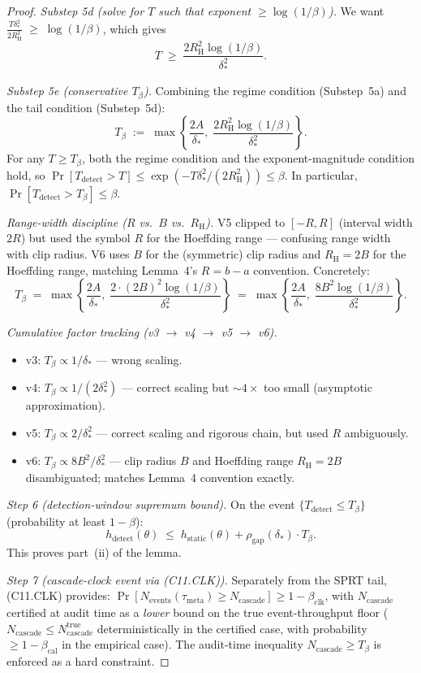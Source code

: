 \documentclass{article}
\newcommand{\deltastar}{\delta_{*}}
\newcommand{\rhogap}{\rho_{\mathrm{gap}}}
\newcommand{\Tbeta}{T_{\beta}}
\newcommand{\Ncasc}{N_{\mathrm{cascade}}}
\newcommand{\Nev}{N_{\mathrm{events}}}
\newcommand{\bclk}{\beta_{\mathrm{clk}}}
\newcommand{\bcal}{\beta_{\mathrm{cal}}}
\newcommand{\Bclip}{B}
\newcommand{\Rh}{R_{\mathrm{H}}}
\begin{document}
\begin{proof}
\emph{Substep 5d (solve for $T$ such that exponent $\geq \log(1/\beta)$).}
We want
$\frac{T \deltastar^2}{2 \Rh^2} \;\geq\; \log(1/\beta)$,
which gives
\[
  T \;\geq\; \frac{2 \Rh^2 \log(1/\beta)}{\deltastar^2}.
\]

\emph{Substep 5e (conservative $\Tbeta$).}  Combining the regime
condition (Substep~5a) and the tail condition (Substep~5d):
\[
  \Tbeta \;:=\; \max\!\left\{\frac{2A}{\deltastar},\;
  \frac{2\Rh^2 \log(1/\beta)}{\deltastar^2}\right\}.
\]
For any $T \geq \Tbeta$, both the regime condition and the
exponent-magnitude condition hold, so $\Pr[T_{\mathrm{detect}} > T]
\leq \exp(-T\deltastar^2/(2\Rh^2)) \leq \beta$.  In particular,
$\Pr[T_{\mathrm{detect}} > \Tbeta] \leq \beta$.

\emph{Range-width discipline ($R$ vs.\ $\Bclip$ vs.\ $\Rh$).}  V5
clipped to $[-R, R]$ (interval width $2R$) but used the symbol $R$
for the Hoeffding range — confusing range width with clip radius.
V6 uses $\Bclip$ for the (symmetric) clip radius and
$\Rh = 2\Bclip$ for the Hoeffding range, matching Lemma~4's
$R = b - a$ convention.  Concretely:
\[
  \Tbeta \;=\; \max\!\left\{\frac{2A}{\deltastar},\;
  \frac{2 \cdot (2\Bclip)^2 \log(1/\beta)}{\deltastar^2}\right\}
  \;=\; \max\!\left\{\frac{2A}{\deltastar},\;
  \frac{8 \Bclip^2 \log(1/\beta)}{\deltastar^2}\right\}.
\]

\emph{Cumulative factor tracking (v3 $\to$ v4 $\to$ v5 $\to$ v6).}
\begin{itemize}
\item v3: $\Tbeta \propto 1/\deltastar$ — wrong scaling.
\item v4: $\Tbeta \propto 1/(2\deltastar^2)$ — correct scaling but
  $\sim$$4\times$ too small (asymptotic approximation).
\item v5: $\Tbeta \propto 2/\deltastar^2$ — correct scaling and
  rigorous chain, but used $R$ ambiguously.
\item v6: $\Tbeta \propto 8\Bclip^2/\deltastar^2$ — clip radius
  $\Bclip$ and Hoeffding range $\Rh = 2\Bclip$ disambiguated;
  matches Lemma~4 convention exactly.
\end{itemize}

\emph{Step 6 (detection-window supremum bound).}  On the event
$\{T_{\mathrm{detect}} \leq \Tbeta\}$ (probability at least
$1-\beta$):
\[
  h_{\mathrm{detect}}(\theta) \;\leq\;
  h_{\mathrm{static}}(\theta) + \rhogap(\deltastar) \cdot
  \Tbeta.
\]
This proves part~(ii) of the lemma.

\emph{Step 7 (cascade-clock event via (C11.CLK)).}  Separately
from the SPRT tail, (C11.CLK) provides:
$\Pr[\Nev(\tau_{\mathrm{meta}}) \geq \Ncasc] \geq 1 - \bclk$, with
$\Ncasc$ certified at audit time as a \emph{lower} bound on the
true event-throughput floor ($\Ncasc \leq \Ncasc^{\mathrm{true}}$
deterministically in the certified case, with probability $\geq 1
- \bcal$ in the empirical case).  The audit-time inequality
$\Ncasc \geq \Tbeta$ is enforced as a hard constraint.


\end{proof}
\end{document}
